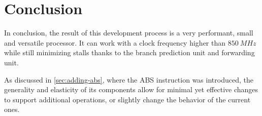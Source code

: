 \chapter{Conclusion}
In conclusion, the result of this development process is a very performant, small and versatile processor. It can work
with a clock frequency higher than $\SI{850}{MHz}$ while still minimizing stalls thanks to the branch prediction unit
and forwarding unit.

As discussed in \autoref{sec:adding-abs}, where the ABS instruction was introduced, the generality and elasticity of
its components allow for minimal yet effective changes to support additional operations, or slightly change the
behavior of the current ones.
